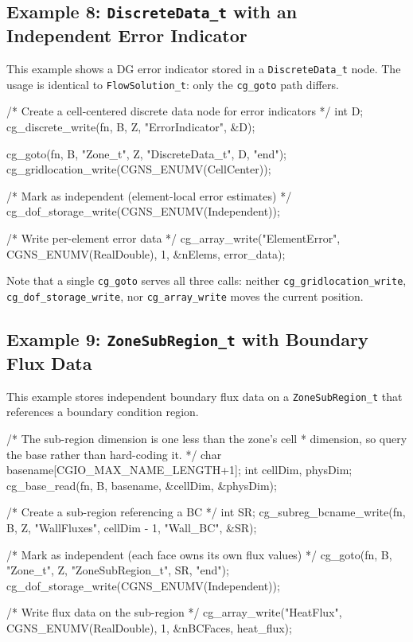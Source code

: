 \documentclass[11pt,letterpaper]{article}
\makeatletter
\let\cgns@orig@lstlisting\lstlisting
\let\cgns@endorig@lstlisting\endlstlisting
\renewenvironment{lstlisting}
  {\par\needspace{5\baselineskip}\nolinenumbers\cgns@orig@lstlisting}
  {\cgns@endorig@lstlisting\par\linenumbers}
\makeatother
\begin{document}
\subsection{Example 8: \texttt{DiscreteData\_t} with an Independent
  Error Indicator}
\label{ex:discrete}

This example shows a DG error indicator stored in a
\texttt{DiscreteData\_t} node.  The usage is identical to
\texttt{FlowSolution\_t}: only the \texttt{cg\_goto} path differs.

\begin{lstlisting}[language=C]
/* Create a cell-centered discrete data node for error indicators */
int D;
cg_discrete_write(fn, B, Z, "ErrorIndicator", &D);

cg_goto(fn, B, "Zone_t", Z, "DiscreteData_t", D, "end");
cg_gridlocation_write(CGNS_ENUMV(CellCenter));

/* Mark as independent (element-local error estimates) */
cg_dof_storage_write(CGNS_ENUMV(Independent));

/* Write per-element error data */
cg_array_write("ElementError", CGNS_ENUMV(RealDouble),
    1, &nElems, error_data);
\end{lstlisting}

Note that a single \texttt{cg\_goto} serves all three calls: neither
\texttt{cg\_gridlocation\_write}, \texttt{cg\_dof\_storage\_write},
nor \texttt{cg\_array\_write} moves the current position.

\subsection{Example 9: \texttt{ZoneSubRegion\_t} with Boundary Flux Data}
\label{ex:subreg}

This example stores independent boundary flux data on a
\texttt{ZoneSubRegion\_t} that references a boundary condition
region.

\begin{lstlisting}[language=C]
/* The sub-region dimension is one less than the zone's cell
 * dimension, so query the base rather than hard-coding it. */
char basename[CGIO_MAX_NAME_LENGTH+1];
int cellDim, physDim;
cg_base_read(fn, B, basename, &cellDim, &physDim);

/* Create a sub-region referencing a BC */
int SR;
cg_subreg_bcname_write(fn, B, Z, "WallFluxes",
    cellDim - 1, "Wall_BC", &SR);

/* Mark as independent (each face owns its own flux values) */
cg_goto(fn, B, "Zone_t", Z, "ZoneSubRegion_t", SR, "end");
cg_dof_storage_write(CGNS_ENUMV(Independent));

/* Write flux data on the sub-region */
cg_array_write("HeatFlux", CGNS_ENUMV(RealDouble),
    1, &nBCFaces, heat_flux);
\end{lstlisting}
\end{document}

